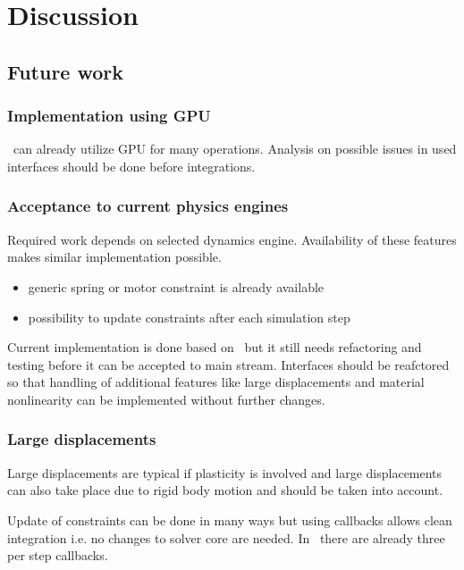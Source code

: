 \section{Discussion}

\subsection{Future work}
\label{subsec:futureWork}

\subsubsection{Implementation using GPU}
\cbullet\ can already utilize GPU for many operations. 
Analysis on possible issues in used interfaces should be done before integrations.

\subsubsection{Acceptance to current physics engines}

Required work depends on selected dynamics engine. Availability of these features makes similar 
implementation possible.

\begin{itemize}
\item generic spring or motor constraint is already available 
\item possibility to update constraints after each simulation step
\end{itemize}

Current implementation is done based on \cbullet\ but it still needs refactoring and testing before it can be 
accepted to main stream. Interfaces should be reafctored so that handling of additional features like large 
displacements and material nonlinearity can be implemented without further changes.

\subsubsection{Large displacements}
Large displacements are typical if plasticity is involved and
large displacements can also take place due to rigid body motion and should be taken into account.

Update of constraints can be done in  many ways but using callbacks allows clean integration i.e. no changes
to solver core are needed.
In \cbullet\ there are already three per step callbacks. 

